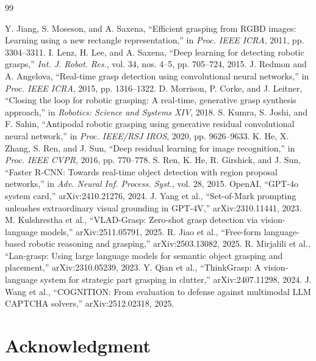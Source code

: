 \documentclass[12pt,letterpaper]{article}
\begin{document}

\newpage
\begin{thebibliography}{99}
 Y. Jiang, S. Moseson, and A. Saxena, ``Efficient grasping from RGBD images: Learning using a new rectangle representation,'' in \emph{Proc. IEEE ICRA}, 2011, pp. 3304--3311.
 I. Lenz, H. Lee, and A. Saxena, ``Deep learning for detecting robotic grasps,'' \emph{Int. J. Robot. Res.}, vol. 34, nos. 4--5, pp. 705--724, 2015.
 J. Redmon and A. Angelova, ``Real-time grasp detection using convolutional neural networks,'' in \emph{Proc. IEEE ICRA}, 2015, pp. 1316--1322.
 D. Morrison, P. Corke, and J. Leitner, ``Closing the loop for robotic grasping: A real-time, generative grasp synthesis approach,'' in \emph{Robotics: Science and Systems XIV}, 2018.
 S. Kumra, S. Joshi, and F. Sahin, ``Antipodal robotic grasping using generative residual convolutional neural network,'' in \emph{Proc. IEEE/RSJ IROS}, 2020, pp. 9626--9633.
 K. He, X. Zhang, S. Ren, and J. Sun, ``Deep residual learning for image recognition,'' in \emph{Proc. IEEE CVPR}, 2016, pp. 770--778.
 S. Ren, K. He, R. Girshick, and J. Sun, ``Faster R-CNN: Towards real-time object detection with region proposal networks,'' in \emph{Adv. Neural Inf. Process. Syst.}, vol. 28, 2015.
 OpenAI, ``GPT-4o system card,'' arXiv:2410.21276, 2024.
 J. Yang et al., ``Set-of-Mark prompting unleashes extraordinary visual grounding in GPT-4V,'' arXiv:2310.11441, 2023.
 M. Kulshrestha et al., ``VLAD-Grasp: Zero-shot grasp detection via vision-language models,'' arXiv:2511.05791, 2025.
 R. Jiao et al., ``Free-form language-based robotic reasoning and grasping,'' arXiv:2503.13082, 2025.
 R. Mirjalili et al., ``Lan-grasp: Using large language models for semantic object grasping and placement,'' arXiv:2310.05239, 2023.
 Y. Qian et al., ``ThinkGrasp: A vision-language system for strategic part grasping in clutter,'' arXiv:2407.11298, 2024.
 J. Wang et al., ``COGNITION: From evaluation to defense against multimodal LLM CAPTCHA solvers,'' arXiv:2512.02318, 2025.
\end{thebibliography}

\section*{Acknowledgment}
\end{document}
